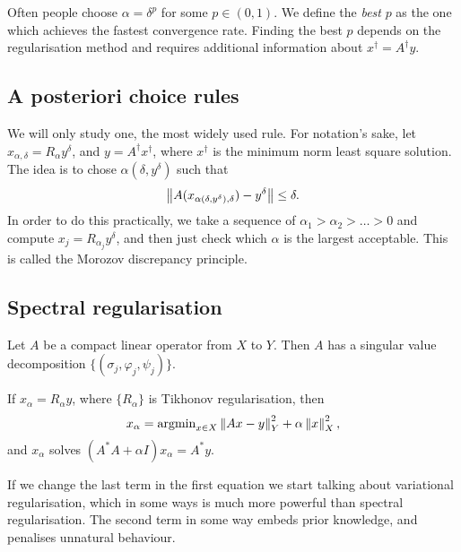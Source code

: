 \documentclass[12pt]{article}
\begin{document}
Often people choose $\alpha = \delta^p$ for some $p\in(0,1)$. We define the \textit{best} $p$ as the one which achieves the fastest convergence rate. Finding the best $p$ depends on the regularisation method and requires additional information about $x^\dagger =A^\dagger y$.

\subsection{A posteriori choice rules}
We will only study one, the most widely used rule. For notation's sake, let $x_{\alpha,\delta} = R_\alpha y^\delta$, and $y= A^\dagger x^\dagger $, where $x^\dagger $ is the minimum norm least square solution. The idea is to chose $\alpha(\delta,y^\delta)$ such that 
\begin{equation*}
    \left\lVert A(x_{\alpha(\delta,y^\delta),\delta}) -y^\delta \right\rVert \leq \delta.
\end{equation*}
In order to do this practically, we take a sequence of $\alpha_1>\alpha_2>\dots>0$ and compute $x_j=R_{\alpha_j} y^\delta$, and then just check which $\alpha$ is the largest acceptable. This is called the Morozov discrepancy principle.

\subsection{Spectral regularisation}
Let $A$ be a compact linear operator from $X$ to $Y$. Then $A$ has a singular value decomposition $\{(\sigma_j,\varphi_j,\psi_j)\}$.

\begin{theorem}
    If $x_\alpha = R_\alpha y$, where $\{R_\alpha\}$ is Tikhonov regularisation, then 
    \begin{equation*}
        x_\alpha = \operatorname{argmin}_{x\in X} \left\lVert Ax-y\right\rVert_Y^2+\alpha\left\lVert x\right\rVert_X^2,
    \end{equation*}
    and $x_\alpha$ solves $(A^*A+\alpha I)x_\alpha = A^* y$. 
\end{theorem}
If we change the last term in the first equation we start talking about variational regularisation, which in some ways is much more powerful than spectral regularisation. The second term in some way embeds prior knowledge, and penalises unnatural behaviour.

\newpage
\end{document}
